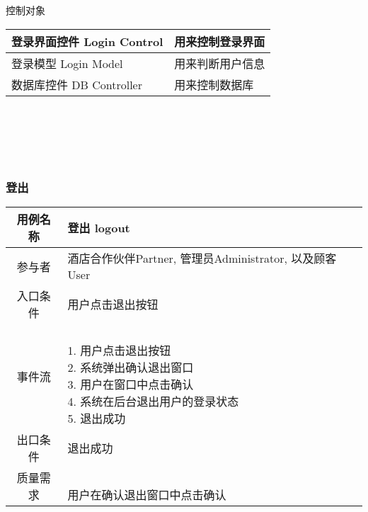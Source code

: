 \documentclass[11pt]{article}
\begin{document}
			
			控制对象 \\
			\begin{tabular}{l|l}\hline
			登录界面控件 Login Control & 用来控制登录界面 \\ \hline
			登录模型 Login Model & 用来判断用户信息 \\ \hline 	
			数据库控件 DB Controller & 用来控制数据库 \\ \hline
			\end{tabular} \\ \\ \\ \\

		
		\subsubsection{登出}
		
			\begin{tabular}{c|l}
			\hline
			用例名称 & 登出 logout \\ \hline
			参与者 & 酒店合作伙伴Partner, 管理员Administrator, 以及顾客User  \\ \hline
			入口条件 & 用户点击退出按钮 \\ \hline
			事件流 & 	\parbox{33em}{\ \\
						1. 用户点击退出按钮 \\
						2. 系统弹出确认退出窗口 \\
						3. 用户在窗口中点击确认  \\
						4. 系统在后台退出用户的登录状态 \\
						5. 退出成功 \\
						} \\ \hline
			出口条件 & 退出成功 \\ \hline
			质量需求 & \parbox{33em}{\ \\
						用户在确认退出窗口中点击确认 \\
						} \\ \hline
			\end{tabular}\\ \\ \\ \\ 
			
\end{document}
